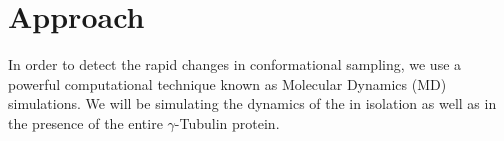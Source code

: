  \section{Approach}
 
In order to detect the rapid changes in conformational sampling, we use a powerful computational technique known as Molecular Dynamics (MD) simulations. We will be simulating the dynamics of the \gct{} in isolation as well as in the presence of the entire $\gamma$-Tubulin protein. 

 
 
 
 
 